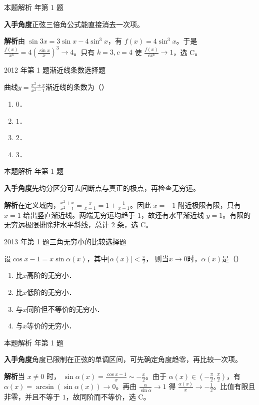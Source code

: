 \documentclass[UTF8,zihao=-4,fontset=fandol]{ctexart}
\newcommand{\pickout}{\hfill（\hspace{1.4em}）}
\newenvironment{abcd}{\begin{enumerate}[label=\textup{(\Alph*)},leftmargin=2.3em,itemsep=1pt,topsep=4pt,parsep=1pt]}{\end{enumerate}}
\newcommand{\QuestionPage}[6]{%
  \par\noindent\begin{minipage}{\linewidth}
  \raggedright
  {\small\textcolor{black!60}{#3\quad #5}\hfill\textcolor{accent}{#2}}\par\smallskip}
\newcommand{\QuestionEnd}{\end{minipage}\par\medskip}
\newcommand{\QuestionPage}[6]{%
  \clearpage
  {\small\textcolor{accent}{#1\hfill #2}}\par\medskip
  {\small\textcolor{black!60}{#3\quad #5\hfill #6}}\par\vspace{9bp}}
\newcommand{\QuestionEnd}{}
\newenvironment{QuestionSolution}[1]{%
  \clearpage
  {\small\textcolor{black!60}{本题解析\quad #1}}\par\medskip
}{\par\clearpage}
\begin{document}
\begin{QuestionSolution}{2011 年第 1 题}
\textbf{入手角度}\quad 正弦三倍角公式能直接消去一次项。

\textbf{解析}\quad 由 \(\sin 3x=3\sin x-4\sin^3x\)，有 \(f(x)=4\sin^3x\)。于是 \(\frac{f(x)}{x^3}=4(\frac{\sin x}{x})^3\to4\)。只有 \(k=3,c=4\) 使 \(\frac{f(x)}{cx^k}\to1\)，选 C。
\end{QuestionSolution}

\QuestionPage{1.4 无穷小量与无穷大量}{选择题}{2012 年第 1 题}{1}{渐近线条数}{019 / 234}
曲线$y = \frac{x^2 + x}{x^2 - 1}$渐近线的条数为\pickout{}
\begin{abcd}
\item $0$．
\item $1$．
\item $2$．
\item $3$．
\end{abcd}
\QuestionEnd

\begin{QuestionSolution}{2012 年第 1 题}
\textbf{入手角度}\quad 先约分区分可去间断点与真正的极点，再检查无穷远。

\textbf{解析}\quad 在定义域内，\(\frac{x^2+x}{x^2-1}=\frac{x}{x-1}=1+\frac{1}{x-1}\)。因此 \(x=-1\) 附近极限有限，只有 \(x=1\) 给出竖直渐近线。两端无穷远均趋于 \(1\)，故还有水平渐近线 \(y=1\)。有限的无穷远极限排除非水平斜线，总计 \(\boxed{2}\) 条，选 C。
\end{QuestionSolution}

\QuestionPage{1.4 无穷小量与无穷大量}{选择题}{2013 年第 1 题}{1}{三角无穷小的比较}{020 / 234}
设$\cos x - 1 = x\sin \alpha(x)$，其中$\left| \alpha(x) \right| < \frac{\pi}{2}$，
则当$x \to 0$时，$\alpha (x)$是\pickout{}
\begin{abcd}
\item 比$x$高阶的无穷小．
\item 比$x$低阶的无穷小．
\item 与$x$同阶但不等价的无穷小．
\item 与$x$等价的无穷小．
\end{abcd}
\QuestionEnd

\begin{QuestionSolution}{2013 年第 1 题}
\textbf{入手角度}\quad 角度已限制在正弦的单调区间，可先确定角度趋零，再比较一次项。

\textbf{解析}\quad 当 \(x\ne0\) 时，
\(\sin\alpha(x)=\frac{\cos x-1}{x}\sim-\frac{x}{2}\)。由于 \(\alpha(x)\in(-\frac{\pi}{2},\frac{\pi}{2})\)，有 \(\alpha(x)=\arcsin(\sin\alpha(x))\to0\)。再由 \(\frac{\alpha}{\sin\alpha}\to1\) 得 \(\frac{\alpha(x)}{x}\to-\frac{1}{2}\)。比值有限且非零，并且不等于 \(1\)，故同阶而不等价，选 C。
\end{QuestionSolution}
\end{document}
